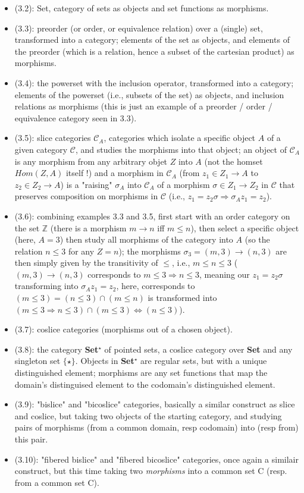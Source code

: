 \documentclass[12pt, letterpaper, twoside]{report}
\begin{document}
\begin{itemize}
	\item (3.2): Set, category of sets as objects and set functions as morphisms.
	\item (3.3): preorder (or order, or equivalence relation) over a (single) set, transformed into a category; elements of the set as objects, and elements of the preorder (which is a relation, hence a subset of the cartesian product) as morphisms.
	\item (3.4): the powerset with the inclusion operator, transformed into a category; elements of the powerset (i.e., subsets of the set) as objects, and inclusion relations as morphisms (this is just an example of a preorder / order / equivalence category seen in 3.3).
	\item (3.5): slice categories $\mathcal{C}_A$, categories which isolate a specific object $A$ of a given category $\mathcal{C}$, and studies the morphisms into that object; an object of $\mathcal{C}_A$ is any morphism from any arbitrary objet $Z$ into $A$ (not the homset $Hom(Z, A)$ itself !) and a morphism in $\mathcal{C}_A$ (from $z_1 \in Z_1 \to A$ to $z_2 \in Z_2 \to A$) is a "raising" $\sigma_A$ into $\mathcal{C}_A$ of a morphism $\sigma \in Z_1 \to Z_2$ in $\mathcal{C}$ that preserves composition on morphisms in $\mathcal{C}$ (i.e., $z_1 = z_2 \sigma \Rightarrow \sigma_A z_1 = z_2$).
	\item (3.6): combining examples 3.3 and 3.5, first start with an order category on the set $\mathbb{Z}$ (there is a morphism $m \to n$ iff $m \leq n$), then select a specific object (here, $A = 3$) then study all morphisms of the category into $A$ (so the relation $n \leq 3$ for any $Z = n$); the morphisms $\sigma_3 = (m, 3) \to (n, 3)$ are then simply given by the transitivity of $\leq$, i.e., $m \leq n \leq 3$ ($(m, 3) \to (n, 3)$ corresponds to $m \leq 3 \Rightarrow n \leq 3$, meaning our $z_1 = z_2 \sigma$ transforming into $\sigma_A z_1 = z_2$, here, corresponds to $(m \leq 3) = (n \leq 3) \cap (m \leq n)$ is transformed into $(m \leq 3 \Rightarrow n \leq 3) \cap (m \leq 3) \Leftrightarrow (n \leq 3)$).
	\item (3.7): coslice categories (morphisms out of a chosen object).
	\item (3.8): the category \textbf{Set$^\star$} of pointed sets, a coslice category over \textbf{Set} and any singleton set $\{ \star \}$. Objects in \textbf{Set$^\star$} are regular sets, but with a unique distinguished element; morphisms are any set functions that map the domain's distinguised element to the codomain's distinguished element.
	\item (3.9): "bislice" and "bicoslice" categories, basically a similar construct as slice and coslice, but taking two objects of the starting category, and studying pairs of morphisms (from a common domain, resp codomain) into (resp from) this pair.
	\item (3.10): "fibered bislice" and "fibered bicoslice" categories, once again a similair construct, but this time taking two \textit{morphisms} into a common set C (resp. from a common set C).
\end{itemize}
\end{document}
